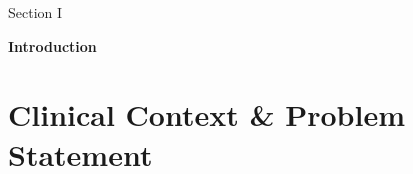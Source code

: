 \documentclass[8pt,aspectratio=169,xcolor=dvipsnames]{beamer}
\begin{document}
{
\begin{frame}[plain]

    \vfill
    \begin{center}
    {\color{white}\large Section I}

    \vspace{1cm}

    {\color{white}\bfseries\fontsize{28}{34}\selectfont Introduction}
    \end{center}
    \vfill

\end{frame}

}

\section{Clinical Context \& Problem Statement}
\end{document}
